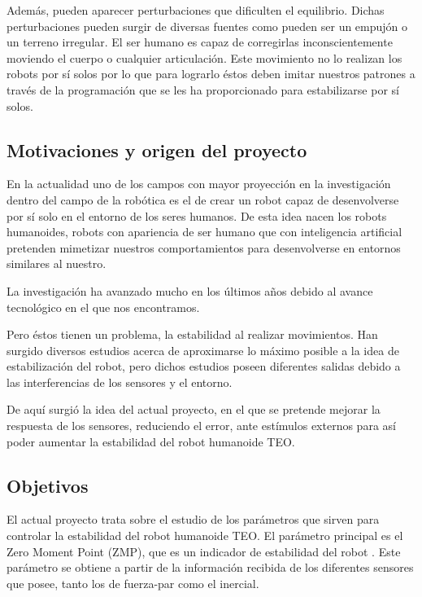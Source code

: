 Además, pueden aparecer perturbaciones que dificulten el equilibrio. Dichas perturbaciones pueden surgir de diversas fuentes como pueden ser un empujón o un terreno irregular. El ser humano es capaz de corregirlas inconscientemente moviendo el cuerpo o cualquier articulación. Este movimiento no lo realizan los robots por sí solos por lo que para lograrlo éstos deben imitar nuestros patrones a través de la programación que se les ha proporcionado para estabilizarse por sí solos. 


\subsection{Motivaciones y origen del proyecto}

En la actualidad uno de los campos con mayor proyección en la investigación dentro del campo de la robótica es el de crear un robot capaz de desenvolverse por sí solo en el entorno de los seres humanos. De esta idea nacen los robots humanoides, robots con apariencia de ser humano que con inteligencia artificial pretenden mimetizar nuestros comportamientos para desenvolverse en entornos similares al nuestro.

La investigación ha avanzado mucho en  los últimos años debido al avance tecnológico en el que nos encontramos. 

Pero éstos tienen un problema, la estabilidad al realizar movimientos. Han surgido diversos estudios acerca de aproximarse lo máximo posible a la idea de estabilización del robot, pero dichos estudios poseen diferentes salidas debido a las interferencias de los sensores y el entorno. 

De aquí surgió la idea del actual proyecto, en el que se pretende mejorar la respuesta de los sensores, reduciendo el error, ante estímulos externos para así poder aumentar la estabilidad del robot humanoide TEO.

\subsection{Objetivos}

El actual proyecto trata sobre el estudio de los parámetros que sirven para controlar la estabilidad del robot humanoide TEO. El parámetro principal es el Zero Moment Point (ZMP), que es un indicador de estabilidad del robot \cite{ref19}. Este parámetro se obtiene a partir de la información recibida de los diferentes sensores que posee, tanto los de fuerza-par como el inercial.

